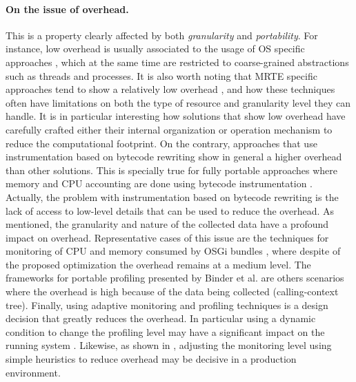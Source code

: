 \paragraph{On the issue of overhead.}
This is a property clearly affected by both \textit{granularity} and \textit{portability}.
For instance, low overhead is usually associated to the usage of OS specific approaches \cite{Banga:1999:RCN:296806.296810, DBLP:conf/pppj/PeternierBBP11, Soltesz:2007:COS:1272998.1273025, Kamp00jails:confining}, which at the same time are restricted to coarse-grained abstractions such as threads and processes.
It is also worth noting that MRTE specific approaches tend to show a relatively low overhead \cite{Price:2003:GCM:829515.830545,dsn/09/geoffray/ijvm, Dmitriev:2004:PJA:974043.974067, citeulike:481405, Attouchi:2014:MMM:2602458.2602467, back_processes_2000, czajkowski_multitasking_2001}, and how these techniques often have limitations on both the type of resource and granularity level they can handle.
It is in particular interesting how solutions that show low overhead have carefully crafted  either their internal organization \cite{back_processes_2000, czajkowski_multitasking_2001} or operation mechanism \cite{Dmitriev:2004:PJA:974043.974067, citeulike:481405} to reduce the computational footprint.
On the contrary, approaches that use instrumentation based on bytecode rewriting show in general a higher overhead than other solutions.
This is specially true for fully portable approaches where memory and CPU accounting are done using bytecode instrumentation \cite{czajkowski_jres:_1998, Hulaas:2004:PTP:1014007.1014024,Hulaas:2008:PTL,binder_portable_2001, Binder200657,Hulaas:2008:PTL}.
Actually, the problem with instrumentation based on bytecode rewriting is the lack of access to low-level details that can be used to reduce the overhead.
As mentioned, the granularity and nature of the collected data have a profound impact on overhead.
Representative cases of this issue are the techniques for monitoring of CPU and memory consumed by OSGi bundles \cite{Maurel:2012:AME:2304736.2304763, Attouchi:2014:MMM:2602458.2602467}, where despite of the proposed optimization the overhead remains at a medium level.
The frameworks for portable profiling presented by Binder et al. \cite{Binder200645, Binder:2009:PPV:1464245.1464249} are others scenarios where the overhead is high because of the data being collected (calling-context tree).
Finally, using adaptive monitoring and profiling techniques is a design decision that greatly reduces the overhead.
In particular using a dynamic condition to change the profiling level may have a significant impact on the running system \cite{Dmitriev:2004:PJA:974043.974067, citeulike:481405}.
Likewise, as shown in \cite{Maurel:2012:AME:2304736.2304763}, adjusting the monitoring level using simple heuristics to reduce overhead may be decisive in a production environment.

